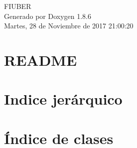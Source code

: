 \documentclass[twoside]{book}
\newcommand{\clearemptydoublepage}{%
  \newpage{\pagestyle{empty}\cleardoublepage}%
}
\begin{document}
\hypersetup{pageanchor=false}
\begin{titlepage}
\vspace*{7cm}
\begin{center}%
{\Large F\-I\-U\-B\-E\-R }\\
\vspace*{1cm}
{\large Generado por Doxygen 1.8.6}\\
\vspace*{0.5cm}
{\small Martes, 28 de Noviembre de 2017 21:00:20}\\
\end{center}
\end{titlepage}
\clearemptydoublepage
\tableofcontents
\clearemptydoublepage
{}
\hypersetup{pageanchor=true}

\chapter{R\-E\-A\-D\-M\-E}
\label{md__r_e_a_d_m_e}
\hypertarget{md__r_e_a_d_m_e}{}

\chapter{Indice jerárquico}

\chapter{Índice de clases}

\end{document}
